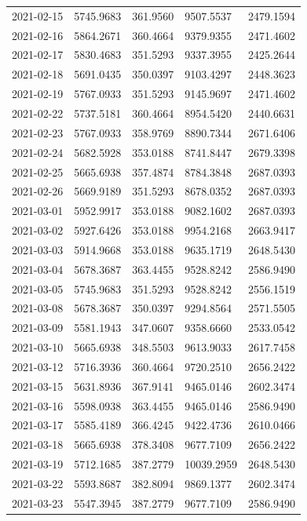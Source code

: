 {\begin{longtable}{lllll}
2021-02-15 & 5745.9683 & 361.9560 & 9507.5537 & 2479.1594 \\
2021-02-16 & 5864.2671 & 360.4664 & 9379.9355 & 2471.4602 \\
2021-02-17 & 5830.4683 & 351.5293 & 9337.3955 & 2425.2644 \\
2021-02-18 & 5691.0435 & 350.0397 & 9103.4297 & 2448.3623 \\
2021-02-19 & 5767.0933 & 351.5293 & 9145.9697 & 2471.4602 \\
2021-02-22 & 5737.5181 & 360.4664 & 8954.5420 & 2440.6631 \\
2021-02-23 & 5767.0933 & 358.9769 & 8890.7344 & 2671.6406 \\
2021-02-24 & 5682.5928 & 353.0188 & 8741.8447 & 2679.3398 \\
2021-02-25 & 5665.6938 & 357.4874 & 8784.3848 & 2687.0393 \\
2021-02-26 & 5669.9189 & 351.5293 & 8678.0352 & 2687.0393 \\
2021-03-01 & 5952.9917 & 353.0188 & 9082.1602 & 2687.0393 \\
2021-03-02 & 5927.6426 & 353.0188 & 9954.2168 & 2663.9417 \\
2021-03-03 & 5914.9668 & 353.0188 & 9635.1719 & 2648.5430 \\
2021-03-04 & 5678.3687 & 363.4455 & 9528.8242 & 2586.9490 \\
2021-03-05 & 5745.9683 & 351.5293 & 9528.8242 & 2556.1519 \\
2021-03-08 & 5678.3687 & 350.0397 & 9294.8564 & 2571.5505 \\
2021-03-09 & 5581.1943 & 347.0607 & 9358.6660 & 2533.0542 \\
2021-03-10 & 5665.6938 & 348.5503 & 9613.9033 & 2617.7458 \\
2021-03-12 & 5716.3936 & 360.4664 & 9720.2510 & 2656.2422 \\
2021-03-15 & 5631.8936 & 367.9141 & 9465.0146 & 2602.3474 \\
2021-03-16 & 5598.0938 & 363.4455 & 9465.0146 & 2586.9490 \\
2021-03-17 & 5585.4189 & 366.4245 & 9422.4736 & 2610.0466 \\
2021-03-18 & 5665.6938 & 378.3408 & 9677.7109 & 2656.2422 \\
2021-03-19 & 5712.1685 & 387.2779 & 10039.2959 & 2648.5430 \\
2021-03-22 & 5593.8687 & 382.8094 & 9869.1377 & 2602.3474 \\
2021-03-23 & 5547.3945 & 387.2779 & 9677.7109 & 2586.9490 \\

\end{longtable}}
